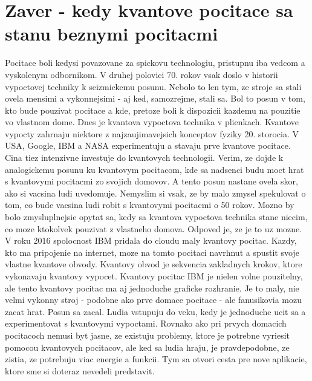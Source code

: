 \documentclass{article}
\begin{document}
\section{Zaver - kedy kvantove pocitace sa stanu beznymi pocitacmi}
Pocitace boli kedysi povazovane za spickovu technologiu, pristupnu iba vedcom a vyskolenym odbornikom. V druhej polovici 70. rokov vsak doslo v historii vypoctovej techniky k seizmickemu posunu. Nebolo to len tym, ze stroje sa stali ovela mensimi a vykonnejsimi - aj ked, samozrejme, stali sa. Bol to posun v tom, kto bude pouzivat pocitace a kde, pretoze boli k dispozicii kazdemu na pouzitie vo vlastnom dome.
\bigbreak
Dnes je kvantova vypoctova technika v plienkach. Kvantove vypocty zahrnaju niektore z najzaujimavejsich konceptov fyziky 20. storocia. V USA, Google, IBM a NASA experimentuju a stavaju prve kvantove pocitace. Cina tiez intenzivne investuje do kvantovych technologii.
\bigbreak
Verim, ze dojde k analogickemu posunu ku kvantovym pocitacom, kde sa nadsenci budu moct hrat s kvantovymi pocitacmi zo svojich domovov. A tento posun nastane ovela skor, ako si vacsina ludi uvedomuje.
\bigbreak
Nemyslim si vsak, ze by malo zmysel spekulovat o tom, co bude vacsina ludi robit s kvantovymi pocitacmi o 50 rokov. Mozno by bolo zmysluplnejsie opytat sa, kedy sa kvantova vypoctova technika stane niecim, co moze ktokolvek pouzivat z vlastneho domova.
\bigbreak
Odpoved je, ze je to uz mozne. V roku 2016 spolocnost IBM pridala do cloudu maly kvantovy pocitac. Kazdy, kto ma pripojenie na internet, moze na tomto pocitaci navrhnut a spustit svoje vlastne kvantove obvody. Kvantovy obvod je sekvencia zakladnych krokov, ktore vykonavaju kvantovy vypocet.
\bigbreak
Kvantovy pocitac IBM je nielen volne pouzitelny, ale tento kvantovy pocitac ma aj jednoduche graficke rozhranie. Je to maly, nie velmi vykonny stroj - podobne ako prve domace pocitace - ale fanusikovia mozu zacat hrat. Posun sa zacal.
\bigbreak
Ludia vstupuju do veku, kedy je jednoduche ucit sa a experimentovat s kvantovymi vypoctami. Rovnako ako pri prvych domacich pocitacoch nemusi byt jasne, ze existuju problemy, ktore je potrebne vyriesit pomocou kvantovych pocitacov, ale ked sa ludia hraju, je pravdepodobne, ze zistia, ze potrebuju viac energie a funkcii. Tym sa otvori cesta pre nove aplikacie, ktore sme si doteraz nevedeli predstavit.
\end{document}
